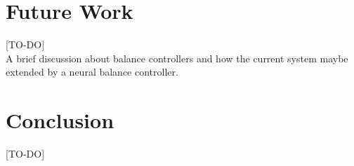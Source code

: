 \documentclass[12pt,twoside]{article}
\theoremstyle{plain}
\theoremstyle{definition}
\theoremstyle{remark}
\begin{document}
\section{Future Work}
\label{sec:Future_Work}
[TO-DO]\\
A brief discussion about balance controllers and how the current system maybe extended by a neural balance controller.

\section{Conclusion}
\label{sec:Conclusion}
[TO-DO]

%
%


\end{document}
